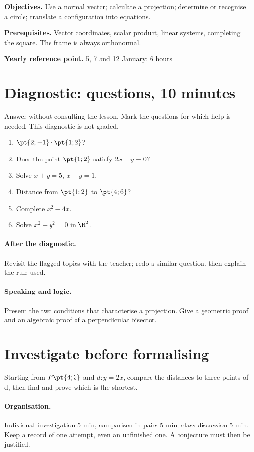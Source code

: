 \label{C07}
\begin{keypoint}
\textbf{Objectives.} Use a normal vector; calculate a projection; determine or recognise a circle; translate a configuration into equations.

\textbf{Prerequisites.} Vector coordinates, scalar product, linear systems, completing the square. The frame is always orthonormal.

\textbf{Yearly reference point.} 5, 7 and 12 January: 6 hours\end{keypoint}
\section*{Diagnostic:  questions, 10 minutes}\label{C07-D}
Answer without consulting the lesson. Mark the questions for which help is needed. This diagnostic is not graded.
\begin{enumerate}
\item $\pt{2;-1}\cdot\pt{1;2}$?
\item Does the point $\pt{1;2}$ satisfy $2x-y=0$?
\item Solve $x+y=5$, $x-y=1$.
\item Distance from $\pt{1;2}$ to $\pt{4;6}$?
\item Complete $x^2-4x$.
\item Solve $x^2+y^2=0$ in $\R^2$.
\end{enumerate}
\paragraph{After the diagnostic.} Revisit the flagged topics with the teacher; redo a similar question, then explain the rule used.
\paragraph{Speaking and logic.} Present the two conditions that characterise a projection. Give a geometric proof and an algebraic proof of a perpendicular bisector.
\mxnewpage
\section*{Investigate before formalising}\label{C07-RECH}
Starting from $P\pt{4;3}$ and $d:y=2x$, compare the distances to three points of d, then find and prove which is the shortest.
\paragraph{Organisation.} Individual investigation 5 min, comparison in pairs 5 min, class discussion 5 min. Keep a record of one attempt, even an unfinished one. A conjecture must then be justified.
\mxnewpage
